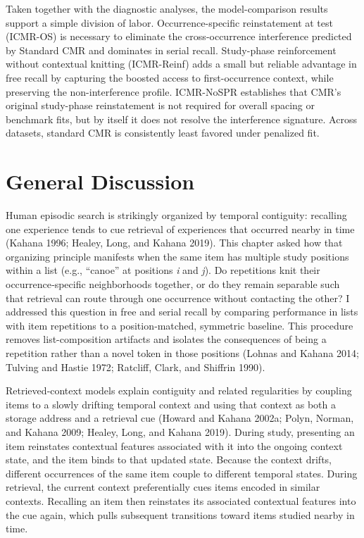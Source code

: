 \documentclass[
  letterpaper,
  11pt,
  english,
  singlespacing,
  headsepline]{MastersDoctoralThesis}
\begin{document}
Taken together with the diagnostic analyses, the model-comparison
results support a simple division of labor. Occurrence-specific
reinstatement at test (ICMR-OS) is necessary to eliminate the
cross-occurrence interference predicted by Standard CMR and dominates in
serial recall. Study-phase reinforcement without contextual knitting
(ICMR-Reinf) adds a small but reliable advantage in free recall by
capturing the boosted access to first-occurrence context, while
preserving the non-interference profile. ICMR-NoSPR establishes that
CMR's original study-phase reinstatement is not required for overall
spacing or benchmark fits, but by itself it does not resolve the
interference signature. Across datasets, standard CMR is consistently
least favored under penalized fit.

\section{General Discussion}\label{general-discussion}

Human episodic search is strikingly organized by temporal contiguity:
recalling one experience tends to cue retrieval of experiences that
occurred nearby in time (Kahana 1996; Healey, Long, and Kahana 2019).
This chapter asked how that organizing principle manifests when the same
item has multiple study positions within a list (e.g., ``canoe'' at
positions \emph{i} and \emph{j}). Do repetitions knit their
occurrence‑specific neighborhoods together, or do they remain separable
such that retrieval can route through one occurrence without contacting
the other? I addressed this question in free and serial recall by
comparing performance in lists with item repetitions to a
position‑matched, symmetric baseline. This procedure removes
list-composition artifacts and isolates the consequences of being a
repetition rather than a novel token in those positions (Lohnas and
Kahana 2014; Tulving and Hastie 1972; Ratcliff, Clark, and Shiffrin
1990).

Retrieved‑context models explain contiguity and related regularities by
coupling items to a slowly drifting temporal context and using that
context as both a storage address and a retrieval cue (Howard and Kahana
2002a; Polyn, Norman, and Kahana 2009; Healey, Long, and Kahana 2019).
During study, presenting an item reinstates contextual features
associated with it into the ongoing context state, and the item binds to
that updated state. Because the context drifts, different occurrences of
the same item couple to different temporal states. During retrieval, the
current context preferentially cues items encoded in similar contexts.
Recalling an item then reinstates its associated contextual features
into the cue again, which pulls subsequent transitions toward items
studied nearby in time.
\end{document}
